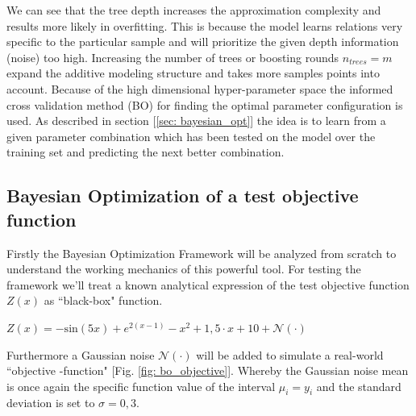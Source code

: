 \documentclass[12pt, a4paper]{article}
\begin{document}
We can see that the tree depth increases the approximation complexity and results more likely in overfitting. This is because the model learns relations very specific to the particular sample and will prioritize the given depth information (noise) too high. Increasing the number of trees or boosting rounds $n_{trees} = m$ expand the additive modeling structure and takes more samples points into account. Because of the high dimensional hyper-parameter space the informed cross validation method (BO) for finding the optimal parameter configuration is used.
As described in section [\ref{sec: bayesian_opt}] the idea is to learn from a given parameter combination which has been tested on the model over the training set and predicting the next better combination.
\newpage
\subsection{Bayesian Optimization of a test objective function}
Firstly the Bayesian Optimization Framework will be analyzed from scratch to understand the working mechanics of this powerful tool. For testing the framework we'll treat a known analytical expression of the test objective function $Z(x)$ as ``black-box" function.
\begin{center}
    $Z(x) = - \text{sin}(5x) + e^{2(x-1)} - x^2 + 1{,}5 \cdot x + 10 + \mathcal{N}(\cdot)$
\end{center}
Furthermore a Gaussian noise $\mathcal{N}(\cdot)$ will be added to simulate a real-world ``objective -function" [Fig. \ref{fig: bo_objective}]. Whereby the Gaussian noise mean is once again the specific function value of the interval $\mu_i = y_i$ and the standard deviation is set to $\sigma = 0{,}3$.
\end{document}
